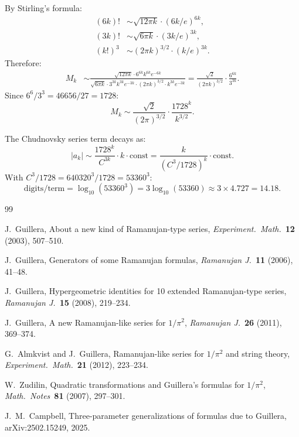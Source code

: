 \documentclass[11pt]{article}
\begin{document}
By Stirling's formula:
\begin{align*}
(6k)! &\sim \sqrt{12\pi k} \cdot (6k/e)^{6k}, \\
(3k)! &\sim \sqrt{6\pi k} \cdot (3k/e)^{3k}, \\
(k!)^3 &\sim (2\pi k)^{3/2} \cdot (k/e)^{3k}.
\end{align*}
Therefore:
\begin{align*}
M_k &\sim \frac{\sqrt{12\pi k} \cdot 6^{6k} k^{6k} e^{-6k}}{\sqrt{6\pi k} \cdot 3^{3k} k^{3k} e^{-3k} \cdot (2\pi k)^{3/2} \cdot k^{3k} e^{-3k}} = \frac{\sqrt{2}}{(2\pi k)^{3/2}} \cdot \frac{6^{6k}}{3^{3k}}.
\end{align*}
Since $6^6/3^3 = 46656/27 = 1728$:
\[
\boxed{M_k \sim \frac{\sqrt{2}}{(2\pi)^{3/2}} \cdot \frac{1728^k}{k^{3/2}}.}
\]

The Chudnovsky series term decays as:
\[
|a_k| \sim \frac{1728^k}{C^{3k}} \cdot k \cdot \text{const} = \frac{k}{(C^3/1728)^k} \cdot \text{const}.
\]
With $C^3/1728 = 640320^3/1728 = 53360^3$:
\[
\text{digits/term} = \log_{10}(53360^3) = 3\log_{10}(53360) \approx 3 \times 4.727 = 14.18.
\]

\begin{thebibliography}{99}

J.~Guillera, About a new kind of Ramanujan-type series, \emph{Experiment.\ Math.}\ \textbf{12} (2003), 507--510.

J.~Guillera, Generators of some Ramanujan formulas, \emph{Ramanujan J.}\ \textbf{11} (2006), 41--48.

J.~Guillera, Hypergeometric identities for 10 extended Ramanujan-type series, \emph{Ramanujan J.}\ \textbf{15} (2008), 219--234.

J.~Guillera, A new Ramanujan-like series for $1/\pi^2$, \emph{Ramanujan J.}\ \textbf{26} (2011), 369--374.

G.~Almkvist and J.~Guillera, Ramanujan-like series for $1/\pi^2$ and string theory, \emph{Experiment.\ Math.}\ \textbf{21} (2012), 223--234.

W.~Zudilin, Quadratic transformations and Guillera's formulas for $1/\pi^2$, \emph{Math.\ Notes}\ \textbf{81} (2007), 297--301.

J.~M.~Campbell, Three-parameter generalizations of formulas due to Guillera, arXiv:2502.15249, 2025.

\end{thebibliography}
\end{document}
